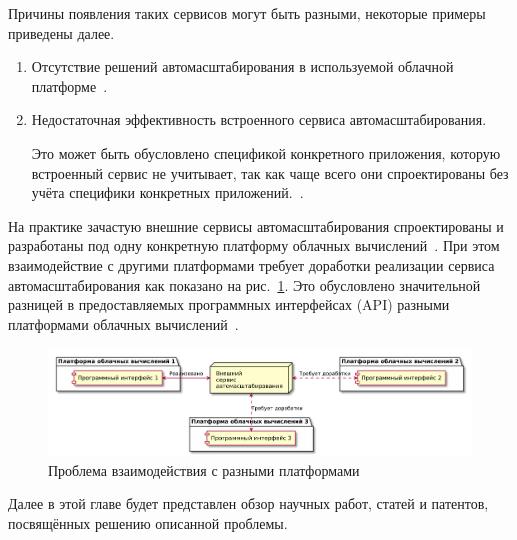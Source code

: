 Причины появления таких сервисов могут быть разными, некоторые примеры приведены далее.
\begin{enumerate}
    \item Отсутствие решений автомасштабирования в используемой облачной платформе~\cite{fake-27}.
    \item Недостаточная эффективность встроенного сервиса автомасштабирования.
    
    Это может быть обусловлено спецификой конкретного приложения, которую встроенный сервис не учитывает, так как чаще всего они спроектированы без учёта специфики конкретных приложений.~\cite{fake-29}.
\end{enumerate}

На практике зачастую внешние сервисы автомасштабирования спроектированы и разработаны под одну конкретную платформу облачных вычислений~\cite{fake-30}.
При этом взаимодействие с другими платформами требует доработки реализации сервиса автомасштабирования как показано на рис.~\ref{ext-different-apis}. 
Это обусловлено значительной разницей в предоставляемых программных интерфейсах (API) разными платформами облачных вычислений~\cite{fake-31}.

\begin{figure}[hbtp]
    \centering
    \includegraphics[width=\textwidth]{img/ext-different-apis.pdf}
    \caption{Проблема взаимодействия с разными платформами}
    \label{ext-different-apis}
\end{figure}

Далее в этой главе будет представлен обзор научных работ, статей и патентов, посвящённых решению описанной проблемы.
